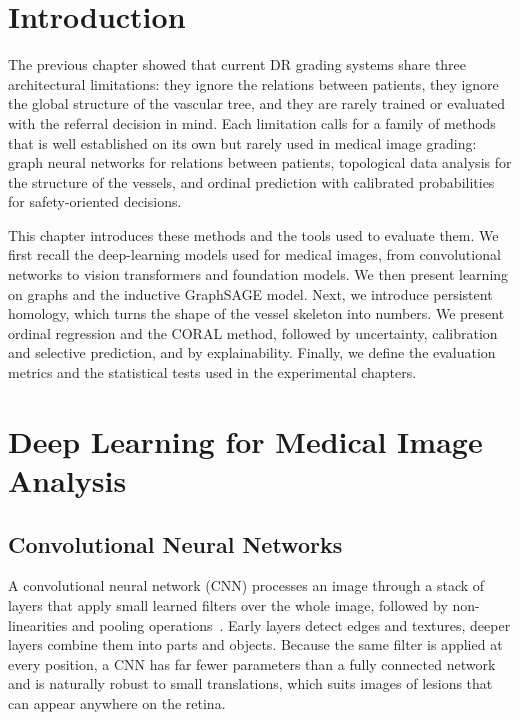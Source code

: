 \section*{Introduction}

The previous chapter showed that current DR grading systems share three architectural
limitations: they ignore the relations between patients, they ignore the global
structure of the vascular tree, and they are rarely trained or evaluated with the
referral decision in mind. Each limitation calls for a family of methods that is well
established on its own but rarely used in medical image grading: graph neural networks for
relations between patients, topological data analysis for the structure of the vessels,
and ordinal prediction with calibrated probabilities for safety-oriented decisions.

This chapter introduces these methods and the tools used to evaluate them. We first
recall the deep-learning models used for medical images, from convolutional networks to
vision transformers and foundation models. We then present learning on graphs and the
inductive GraphSAGE model. Next, we introduce
persistent homology, which turns the shape of the vessel skeleton into numbers. We present
ordinal regression and the CORAL method, followed by uncertainty, calibration and
selective prediction, and by explainability. Finally, we define the evaluation metrics and
the statistical tests used in the experimental chapters.

\section{Deep Learning for Medical Image Analysis}
\label{sec:dl}

\subsection{Convolutional Neural Networks}

A convolutional neural network (CNN) processes an image through a stack of layers that
apply small learned filters over the whole image, followed by non-linearities and pooling
operations~\cite{lecun2015deep,goodfellow2016deep}. Early layers detect edges and textures,
deeper layers combine them into parts and objects. Because the same filter is applied at
every position, a CNN has far fewer parameters than a fully connected network and is
naturally robust to small translations, which suits images of lesions that can appear
anywhere on the retina.

